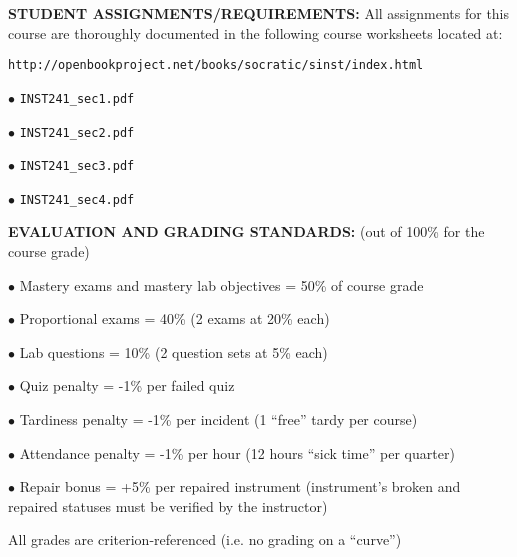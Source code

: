 \vskip 10pt

\noindent
{\bf STUDENT ASSIGNMENTS/REQUIREMENTS:} All assignments for this course are thoroughly documented in the following course worksheets located at:

\noindent
{\tt http://openbookproject.net/books/socratic/sinst/index.html} 

\vskip 5pt

\item{$\bullet$} {\tt INST241\_sec1.pdf} 
\item{$\bullet$} {\tt INST241\_sec2.pdf} 
\item{$\bullet$} {\tt INST241\_sec3.pdf} 
\item{$\bullet$} {\tt INST241\_sec4.pdf} 


\vfil \eject

\noindent
{\bf EVALUATION AND GRADING STANDARDS:} (out of 100\% for the course grade)

\item{$\bullet$} Mastery exams and mastery lab objectives = 50\% of course grade
\item{$\bullet$} Proportional exams = 40\% (2 exams at 20\% each)
\item{$\bullet$} Lab questions = 10\% (2 question sets at 5\% each)
\item{$\bullet$} Quiz penalty = -1\% per failed quiz
\item{$\bullet$} Tardiness penalty = -1\% per incident (1 ``free'' tardy per course)
\item{$\bullet$} Attendance penalty = -1\% per hour (12 hours ``sick time'' per quarter)
\item{$\bullet$} Repair bonus = +5\% per repaired instrument (instrument's broken and repaired statuses must be verified by the instructor)

\vskip 10pt

\noindent
All grades are criterion-referenced (i.e. no grading on a ``curve'')

